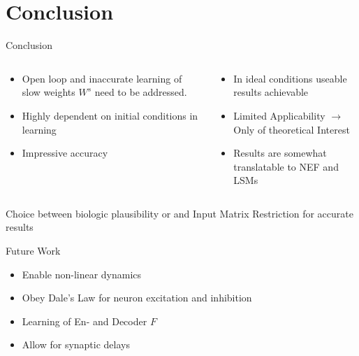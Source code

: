 \documentclass[17pt, t, lualatex]{beamer}
\begin{document}
\section{Conclusion}\insertsectionpage
\begin{frame}{Conclusion}
	\vspace{-1cm}
	\begin{columns}
		\begin{column}{0.45\textwidth}
			\begin{itemize}
				\setlength\itemsep{0.7em}
				\item Open loop and inaccurate learning of slow weights $W^s$ need to be addressed.
				\item Highly dependent on initial conditions in learning
				\item Impressive accuracy
			\end{itemize}
		\end{column}
		\vrule
		\begin{column}{0.45\textwidth}
			\begin{itemize}
				\setlength\itemsep{0.7em}
				\item In ideal conditions useable results achievable
				\item Limited Applicability $\rightarrow$ Only of theoretical Interest
				\item Results are somewhat translatable to NEF and LSMs
			\end{itemize}
		\end{column}
	\end{columns}
	\vspace{0.5cm}
	Choice between biologic plausibility or and Input Matrix Restriction for accurate results
\end{frame}







\begin{frame}{Future Work}
	\begin{itemize}
		\setlength\itemsep{1.5em}
		\item Enable non-linear dynamics
		\item Obey Dale's Law for neuron excitation and inhibition
		\item Learning of En- and Decoder $F$
		\item Allow for synaptic delays
	\end{itemize}
\end{frame}
\end{document}
